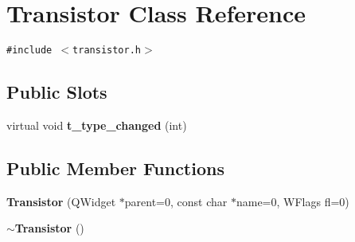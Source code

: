 \section{Transistor Class Reference}
\label{classTransistor}
{\tt \#include $<$transistor.h$>$}

\subsection*{Public Slots}
\begin{CompactItemize}
\item 
virtual void {\bf t\_\-type\_\-changed} (int)
\end{CompactItemize}
\subsection*{Public Member Functions}
\begin{CompactItemize}
\item 
{\bf Transistor} (QWidget $\ast$parent=0, const char $\ast$name=0, WFlags fl=0)
\item 
{\bf $\sim$Transistor} ()
\end{CompactItemize}
